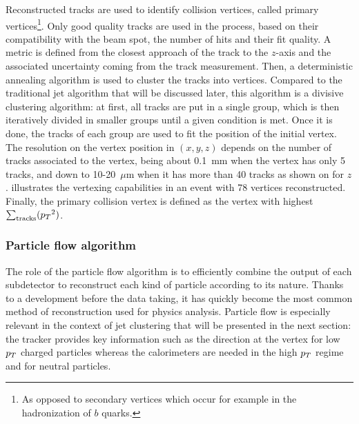     Reconstructed tracks are used to identify collision vertices, called primary
    vertices\footnote{As opposed to secondary vertices which occur for example in the
    hadronization of $b$ quarks.}. Only good quality tracks are used in the process, based on their
    compatibility with the beam spot, the number of hits and their fit quality. A
    metric is defined from the closest approach of the track to the $z$-axis and
    the associated uncertainty coming from the track measurement. Then, a deterministic
    annealing algorithm \cite{DAclustering} is used to cluster the tracks into vertices. Compared to the
    traditional jet algorithm that will be discussed later, this algorithm is a divisive
    clustering algorithm: at first, all tracks are put in a single group, which is then
    iteratively divided in smaller groups until a given condition is met. Once it is
    done, the tracks of each group are used to fit the position of the initial vertex.
    The resolution on the vertex position in $(x,y,z)$ depends on the number of tracks
    associated to the vertex, being about 0.1~mm when the vertex has only 5 tracks, and
    down to 10-20~$\mu$m when it has more than 40 tracks as shown on  for $z$.
     illustrates the vertexing capabilities in an event with
    78 vertices reconstructed. Finally, the primary collision vertex is defined as the
    vertex with highest $\sum_\text{tracks} ({p_T}^2)$.


        \subsubsection{Particle flow algorithm}

    The role of the particle flow algorithm \cite{particleFlow} is to efficiently combine the output of each
    subdetector to reconstruct each kind of particle according to its nature. Thanks
    to a development before the data taking, it has quickly become the most common
    method of reconstruction used for physics analysis. Particle flow is especially
    relevant in the context of jet clustering that will be presented in the next section:
    the tracker provides key information such as the direction at the vertex for low $p_T$
    charged particles whereas the calorimeters are needed in the high $p_T$ regime
    and for neutral particles.

